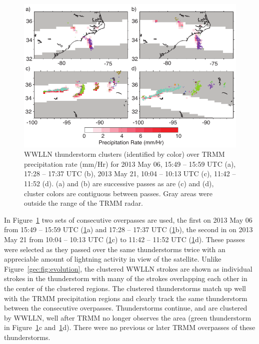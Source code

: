  \begin{figure}[ht!]
    \centering
    \includegraphics[scale=1]{GEC/Figures/overpass.pdf}
    \caption{WWLLN thunderstorm clusters (identified by color) over TRMM precipitation rate (mm/Hr) for 2013 May 06, 15:49 -- 15:59 UTC (a), 17:28 -- 17:37 UTC (b), 2013 May 21, 10:04 -- 10:13 UTC (c), 11:42 -- 11:52 (d).
    		(a) and (b) are successive passes as are (c) and (d), cluster colors are contiguous between passes.
		Gray areas were outside the range of the TRMM radar.}
    \label{gec:fig:overpass}
 \end{figure}

In Figure~\ref{gec:fig:overpass} two sets of consecutive overpasses are used, the first on 2013 May 06 from 15:49 -- 15:59 UTC (\ref{gec:fig:overpass}a) and 17:28 -- 17:37 UTC (\ref{gec:fig:overpass}b), the second in on 2013 May 21 from 10:04 -- 10:13 UTC (\ref{gec:fig:overpass}c) to 11:42 -- 11:52 UTC (\ref{gec:fig:overpass}d).
These passes were selected as they passed over the same thunderstorms twice with an appreciable amount of lightning activity in view of the satellite.
Unlike Figure~\ref{gec:fig:evolution}, the clustered WWLLN strokes are shown as individual strokes in the thunderstorm with many of the strokes overlapping each other in the center of the clustered regions.
The clustered thunderstorms match up well with the TRMM precipitation regions and clearly track the same thunderstorm between the consecutive overpasses.
Thunderstorms continue, and are clustered by WWLLN, well after TRMM no longer observes the area (green thunderstorm in Figure~\ref{gec:fig:overpass}c and~\ref{gec:fig:overpass}d).
There were no previous or later TRMM overpasses of these thunderstorms.

